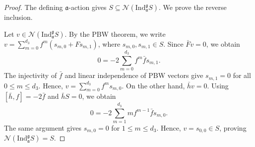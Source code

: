 \documentclass[a4paper,10pt]{article}
\theoremstyle{definition}
\theoremstyle{plain}
\theoremstyle{remark}
\theoremstyle{mystyle}
\numberwithin{equation}{section}
\begin{document}
\begin{proof}
    The defining $\mathfrak a$-action gives $S\subseteq \mathcal N(\mathrm{Ind}_{\mathfrak a}^{\mathfrak g}S)$. We prove the reverse inclusion.

    Let $v\in \mathcal N(\mathrm{Ind}_{\mathfrak a}^{\mathfrak g}S)$. By the PBW theorem, we write $v=\sum\limits_{m=0}^{d_3}f^m(s_{m,0}+Fs_{m,1})$, where \(s_{m,0},s_{m,1}\in S\). Since $\bar Fv=0$, we obtain
    $$
    0=-2\sum_{m=0}^{d_3}f^m\bar fs_{m,1}.
    $$
    The injectivity of \(\bar f\) and linear independence of PBW vectors give $s_{m,1}=0$ for all $0\le m\le d_3$. Hence, $v=\sum\limits_{m=0}^{d_3}f^ms_{m,0}$.
    On the other hand, \(\bar hv=0\). Using \([\bar h,f]=-2\bar f\) and \(\bar hS=0\), we obtain
    $$
    0=-2\sum_{m=1}^{d_3}mf^{m-1}\bar fs_{m,0}.
    $$
    The same argument gives $s_{m,0}=0$ for $1\le m\le d_3$. Hence, $v=s_{0,0}\in S$, proving \(\mathcal N(\mathrm{Ind}_{\mathfrak a}^{\mathfrak g}S)=S\). 
\end{proof}
\end{document}
